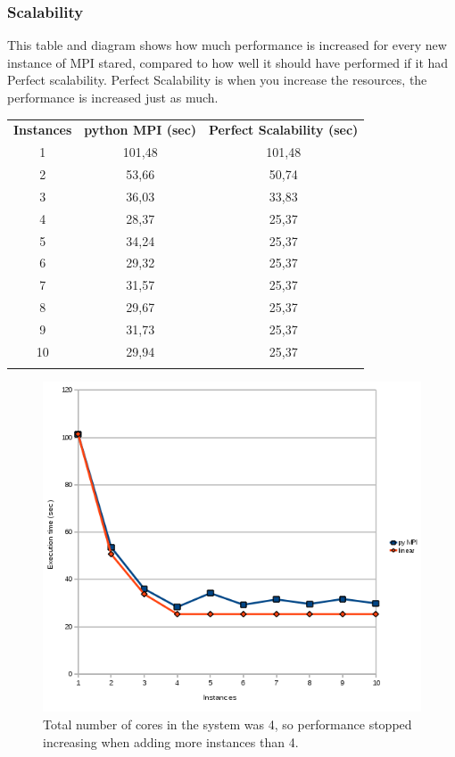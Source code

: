 \documentclass{article}
\begin{document}
\subsubsection{Scalability}
This table and diagram shows how much performance is increased for every
new instance of MPI stared, compared to how well it should have performed
if it had Perfect scalability\cite{jogalekar2000evaluating}. Perfect
Scalability is when you increase the resources, the performance is increased
just as much. 
\begin{table}[h!]
\begin{tabular}{c c c}
  \rowcolor[gray]{0.5}
  {\bf Instances} & {\bf python MPI (sec)} & {\bf Perfect Scalability (sec)} \\
  1 & 101,48 & 101,48 \\
  2 & 53,66  & 50,74  \\
  3 & 36,03  & 33,83  \\
  4 & 28,37  & 25,37  \\
  5 & 34,24  & 25,37  \\
  6 & 29,32  & 25,37  \\
  7 & 31,57  & 25,37  \\
  8 & 29,67  & 25,37  \\
  9 & 31,73  & 25,37  \\
 10 & 29,94  & 25,37  \\
\rowcolor[gray]{0.5}
\end{tabular}
\end{table}
\begin{figure}[h!]
\center

\includegraphics[width=\textwidth]{img/scalabilty-pympi.png}
\caption{Total number of cores in the system was 4, so performance stopped
increasing when adding more instances than 4. }
\end{figure}
\end{document}
